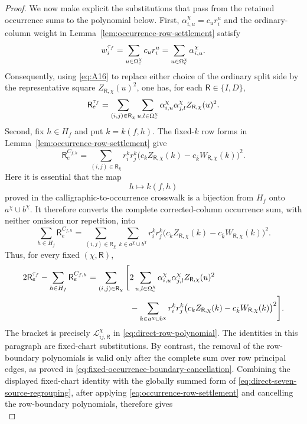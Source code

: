 \documentclass[11pt]{article}
\begin{document}
\begin{proof}
We now make explicit the substitutions that pass from the retained
occurrence sums to the polynomial below.  First,
$\alpha_{i,u}^{\chi}=c_ur_i^u$ and the ordinary-column weight in
Lemma~\ref{lem:occurrence-row-settlement} satisfy
\[
 w_i^{\tau_f}
 =\sum_{u\in\Omega_{\rm c}^{\chi}}c_ur_i^u
 =\sum_{u\in\Omega_{\rm c}^{\chi}}\alpha_{i,u}^{\chi}.
\]
Consequently, using \eqref{eq:A16} to replace either choice of the ordinary
split side by the representative square $Z_{\mathsf R,\chi}(u)^2$, one has,
for each $\mathsf R\in\{I,D\}$,
\[
 \mathsf R_e^{\tau_f}
 =\sum_{(i,j)\in\mathsf R_\chi}
   \sum_{u,l\in\Omega_{\rm c}^{\chi}}
   \alpha_{i,u}^{\chi}\alpha_{j,l}^{\chi}
   Z_{\mathsf R,\chi}(u)^2.
\]
Second, fix $h\in H_f$ and put $k=k(f,h)$.  The fixed-$k$ row forms in
Lemma~\ref{lem:occurrence-row-settlement} give
\[
 \mathsf R_e^{C_{f,h}}
 =\sum_{(i,j)\in\mathsf R_\chi}
   r_i^kr_j^k
   \bigl(c_kZ_{\mathsf R,\chi}(k)
         -c_{\bar k}W_{\mathsf R,\chi}(k)\bigr)^2.
\]
Here it is essential that the map
\[
 h\longmapsto k(f,h)
\]
proved in the calligraphic-to-occurrence crosswalk is a bijection from $H_f$
onto $a^\chi\cup b^\chi$.  It therefore converts the complete corrected-column
occurrence sum, with neither omission nor repetition, into
\[
 \sum_{h\in H_f}\mathsf R_e^{C_{f,h}}
 =\sum_{(i,j)\in\mathsf R_\chi}
   \sum_{k\in a^\chi\cup b^\chi}
   r_i^kr_j^k
   \bigl(c_kZ_{\mathsf R,\chi}(k)
         -c_{\bar k}W_{\mathsf R,\chi}(k)\bigr)^2.
\]
Thus, for every fixed $(\chi,\mathsf R)$,
\[
\begin{aligned}
2\mathsf R_e^{\tau_f}
-\sum_{h\in H_f}\mathsf R_e^{C_{f,h}}
=\sum_{(i,j)\in\mathsf R_\chi}\Bigg[
&2\sum_{u,l\in\Omega_{\rm c}^{\chi}}
 \alpha_{i,u}^{\chi}\alpha_{j,l}^{\chi}
 Z_{\mathsf R,\chi}(u)^2\\
&-\sum_{k\in a^\chi\cup b^\chi}
 r_i^kr_j^k
 \bigl(c_kZ_{\mathsf R,\chi}(k)
       -c_{\bar k}W_{\mathsf R,\chi}(k)\bigr)^2
\Bigg].
\end{aligned}
\]
The bracket is precisely
$\mathcal L_{ij,\mathsf R}^{\chi}$ in \eqref{eq:direct-row-polynomial}.
The identities in this paragraph are fixed-chart substitutions.  By contrast,
the removal of the row-boundary polynomials is valid only after the complete
sum over row principal edges, as proved in
\eqref{eq:fixed-occurrence-boundary-cancellation}.  Combining the displayed
fixed-chart identity with the globally summed form of
\eqref{eq:direct-seven-source-regrouping}, after applying
\eqref{eq:occurrence-row-settlement} and cancelling the row-boundary
polynomials, therefore gives
\begin{equation}\label{eq:direct-row-settlement}

\end{equation}
\end{proof}
\end{document}
